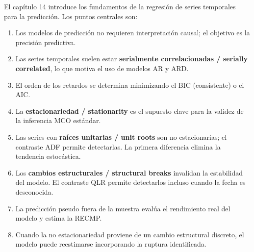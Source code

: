 \documentclass[12pt]{article}
\begin{document}
El cap\'itulo 14 introduce los fundamentos de la regresi\'on de series temporales para la predicci\'on. Los puntos centrales son:

\begin{enumerate}
  \item Los modelos de predicci\'on no requieren interpretaci\'on causal; el objetivo es la precisi\'on predictiva.
  \item Las series temporales suelen estar \textbf{serialmente correlacionadas / serially correlated}, lo que motiva el uso de modelos AR y ARD.
  \item El orden de los retardos se determina minimizando el BIC (consistente) o el AIC.
  \item La \textbf{estacionariedad / stationarity} es el supuesto clave para la validez de la inferencia MCO est\'andar.
  \item Las series con \textbf{ra\'ices unitarias / unit roots} son no estacionarias; el contraste ADF permite detectarlas. La primera diferencia elimina la tendencia estoc\'astica.
  \item Los \textbf{cambios estructurales / structural breaks} invalidan la estabilidad del modelo. El contraste QLR permite detectarlos incluso cuando la fecha es desconocida.
  \item La predicci\'on pseudo fuera de la muestra eval\'ua el rendimiento real del modelo y estima la RECMP.
  \item Cuando la no estacionariedad proviene de un cambio estructural discreto, el modelo puede reestimarse incorporando la ruptura identificada.
\end{enumerate}
\end{document}
